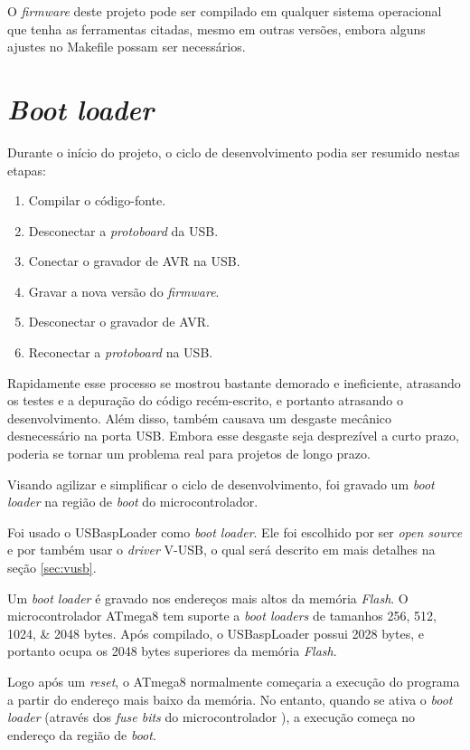 \documentclass[brazil,pagestart=firstchapter]{abnt}
\newcommand*{\VUSB}{\mbox{V-USB}\xspace}
\begin{document}
O \textit{firmware} deste projeto pode ser compilado em qualquer sistema
operacional que tenha as ferramentas citadas, mesmo em outras versões,
embora alguns ajustes no Makefile possam ser necessários.


\section{\textit{Boot loader}}
\label{sec:bootloader}

Durante o início do projeto, o ciclo de desenvolvimento podia ser resumido
nestas etapas:

\begin{enumerate}
\item Compilar o código-fonte.
\item Desconectar a \textit{protoboard} da \ac{USB}.
\item Conectar o gravador de AVR na \ac{USB}.
\item Gravar a nova versão do \textit{firmware}.
\item Desconectar o gravador de AVR.
\item Reconectar a \textit{protoboard} na \ac{USB}.
\end{enumerate}

Rapidamente esse processo se mostrou bastante demorado e ineficiente,
atrasando os testes e a depuração do código recém-escrito, e portanto
atrasando o desenvolvimento. Além disso, também causava um desgaste mecânico
desnecessário na porta \ac{USB}. Embora esse desgaste seja desprezível a
curto prazo, poderia se tornar um problema real para projetos de longo
prazo.

Visando agilizar e simplificar o ciclo de desenvolvimento, foi gravado um
\textit{boot loader} na região de \textit{boot} do microcontrolador.

Foi usado o USBaspLoader \cite{USBaspLoader} como \textit{boot loader}. Ele
foi escolhido por ser \textit{open source} e por também usar o
\textit{driver} \VUSB, o qual será descrito em mais detalhes na seção
\ref{sec:vusb}.

Um \textit{boot loader} é gravado nos endereços mais altos da memória
\textit{Flash}. O microcontrolador ATmega8 tem suporte a \textit{boot
loaders} de tamanhos \numlist{256;512;1024;2048} bytes.
\cite[p.~213]{ATmega8} Após compilado, o USBaspLoader possui \num{2028}
bytes, e portanto ocupa os \num{2048} bytes superiores da memória
\textit{Flash}.

Logo após um \textit{reset}, o ATmega8 normalmente começaria a execução do
programa a partir do endereço mais baixo da memória. No entanto, quando se
ativa o \textit{boot loader} (através dos \textit{fuse bits} do
microcontrolador \cite[p.~216]{ATmega8}), a execução começa no endereço da
região de \textit{boot}.
\end{document}
